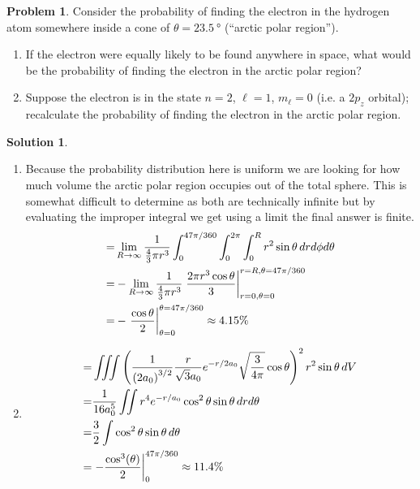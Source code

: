 \documentclass[10pt]{article}
\theoremstyle{definition}
\newtheorem{problem}{Problem}
\newtheorem{soln}{Solution}
\begin{document}
\begin{problem}
Consider the probability of finding the electron in the hydrogen atom somewhere inside a cone of $\theta=\qty{23.5}{\degree}$
(``arctic polar region'').
\begin{enumerate}[label=(\alph*)]
  \item If the electron were equally likely to be found anywhere in space, what would be the probability of finding the
        electron in the arctic polar region?
  \item Suppose the electron is in the state $n = 2$, $\ell = 1$, $m_\ell = 0$ (i.e. a $2p_z$ orbital); recalculate the probability of
        finding the electron in the arctic polar region.
\end{enumerate}
\end{problem}
\begin{soln}~
  \begin{enumerate}[label=(\alph*)]
    \item Because the probability distribution here is uniform we are looking for how much volume the arctic polar region occupies out of the total sphere.
          This is somewhat difficult to determine as both are technically infinite but by evaluating the improper integral we get using a limit the final answer is finite.
          \begin{align*}
            = & \lim_{R\to\infty}\frac{1}{\frac{4}{3}\pi r^3}\int_{0}^{47\pi/360}\int_{0}^{2\pi}\int_0^R r^2\sin\theta\,dr d\phi d\theta \\
            = & -\lim_{R\to\infty}\frac{1}{\frac{4}{3}\pi r^3}\eval{\frac{2\pi r^3\cos\theta}{3}}_{r=0,\theta=0}^{r=R,\theta=47\pi/360}  \\
            = & -\eval{\frac{\cos\theta}{2}}_{\theta=0}^{\theta=47\pi/360}\approx 4.15\%
          \end{align*}
    \item \begin{align*}
            = & \iiint \left(\frac{1}{\left(2a_0\right)^{3/2}}\frac{r}{\sqrt{3}a_0}e^{-r/2a_0}\sqrt{\frac{3}{4\pi}}\cos\theta\right)^2r^2\sin\theta\,dV \\
            = & \frac{1}{16a_0^5}\iint r^4e^{-r/a_0}\cos^2\theta\sin\theta\,dr d\theta                                                                  \\
            = & \frac{3}{2}\int \cos^2\theta\sin\theta\,d\theta                                                                                         \\
            = & \eval{-\frac{\cos^3(\theta)}{2}}_{0}^{47\pi/360}\approx 11.4\%
          \end{align*}
  \end{enumerate}
\end{soln}
\end{document}
